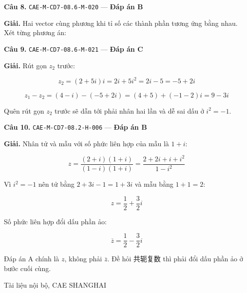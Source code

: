 \documentclass[11pt, a4paper]{article}
\begin{document}
\textbf{Câu 8.} \texttt{CAE-M-CD7-08.6-M-020} — \textbf{Đáp án B}

\textbf{Giải.} Hai vector cùng phương khi tỉ số các thành phần tương ứng bằng nhau. Xét từng phương án:


\textbf{Câu 9.} \texttt{CAE-M-CD7-08.6-M-021} — \textbf{Đáp án C}

\textbf{Giải.} Rút gọn $z_2$ trước:

$$z_2 = (2 + 5i)i = 2i + 5i^2 = 2i - 5 = -5 + 2i$$

$$z_1 - z_2 = (4 - i) - (-5 + 2i) = (4 + 5) + (-1 - 2)i = 9 - 3i$$

 Quên rút gọn $z_2$ trước sẽ dẫn tới phải nhân hai lần và dễ sai dấu ở $i^2 = -1$.

\textbf{Câu 10.} \texttt{CAE-M-CD7-08.2-H-006} — \textbf{Đáp án B}

\textbf{Giải.} Nhân tử và mẫu với số phức liên hợp của mẫu là $1 + i$:

$$z = \frac{(2+i)(1+i)}{(1-i)(1+i)} = \frac{2 + 2i + i + i^2}{1 - i^2}$$

Vì $i^2 = -1$ nên tử bằng $2 + 3i - 1 = 1 + 3i$ và mẫu bằng $1 + 1 = 2$:

$$z = \frac{1}{2} + \frac{3}{2}i$$

Số phức liên hợp đổi dấu phần ảo:

$$\overline{z} = \frac{1}{2} - \frac{3}{2}i$$

 Đáp án A chính là $z$, không phải $\overline{z}$. Đề hỏi 共轭复数 thì phải đổi dấu phần ảo ở bước cuối cùng.
\vspace{0.8cm}
\begin{center}
{\footnotesize\color{cae_blue} Tài liệu nội bộ, CAE SHANGHAI}
\end{center}
\end{document}
